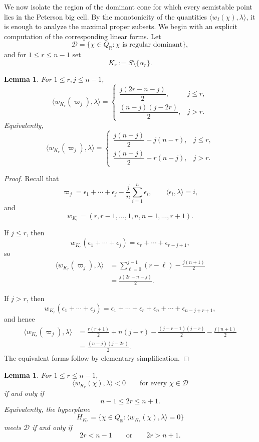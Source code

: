 \documentclass[12pt, reqno]{amsart}
\theoremstyle{plain}
\numberwithin{equation}{section}
\newtheorem{lemma}[theorem]{Lemma}
\theoremstyle{definition}
\begin{document}
We now isolate the region of the dominant cone for which every
semistable point lies in the Peterson big cell. By the monotonicity
of the quantities
\(\langle w_I(\chi),\lambda\rangle\), it is enough to analyze the
maximal proper subsets. 
We begin with an explicit computation of the corresponding linear
forms. Let
\[
\mathcal D
=
\{\chi\in Q_{\mathbb R}:\chi\text{ is regular dominant}\},
\]
and for \(1\le r\le n-1\) set
\[
K_r:=S\setminus\{\alpha_r\}.
\]

\begin{lemma}\label{lem:maximal-parabolic-weights}
For \(1\le r,j\le n-1\),
\[
\bigl\langle w_{K_r}(\varpi_j),\lambda\bigr\rangle
=
\begin{cases}
\dfrac{j(2r-n-j)}2, & j\le r,\\[6pt]
\dfrac{(n-j)(j-2r)}2, & j>r.
\end{cases}
\]
Equivalently,
\[
\bigl\langle w_{K_r}(\varpi_j),\lambda\bigr\rangle
=
\begin{cases}
\dfrac{j(n-j)}2-j(n-r), & j\le r,\\[6pt]
\dfrac{j(n-j)}2-r(n-j), & j>r.
\end{cases}
\]
\end{lemma}

\begin{proof}
Recall that
\[
\varpi_j
=
\epsilon_1+\cdots+\epsilon_j
-\frac{j}{n}\sum_{i=1}^n\epsilon_i,
\qquad
\langle\epsilon_i,\lambda\rangle=i,
\]
and
\[
w_{K_r}
=
(r,r-1,\ldots,1,n,n-1,\ldots,r+1).
\]

If \(j\le r\), then
\[
w_{K_r}(\epsilon_1+\cdots+\epsilon_j)
=
\epsilon_r+\cdots+\epsilon_{r-j+1},
\]
so
\[
\begin{aligned}
\bigl\langle w_{K_r}(\varpi_j),\lambda\bigr\rangle
&=
\sum_{\ell=0}^{j-1}(r-\ell)
-\frac{j(n+1)}2  \\
&=
\frac{j(2r-n-j)}2.
\end{aligned}
\]

If \(j>r\), then
\[
w_{K_r}(\epsilon_1+\cdots+\epsilon_j)
=
\epsilon_1+\cdots+\epsilon_r
+\epsilon_n+\cdots+\epsilon_{n-j+r+1},
\]
and hence
\[
\begin{aligned}
\bigl\langle w_{K_r}(\varpi_j),\lambda\bigr\rangle
&=
\frac{r(r+1)}2
+n(j-r)
-\frac{(j-r-1)(j-r)}2
-\frac{j(n+1)}2 \\
&=
\frac{(n-j)(j-2r)}2.
\end{aligned}
\]
The equivalent forms follow by elementary simplification.
\end{proof}

\begin{lemma}\label{lem:maximal-parabolic-walls}
For \(1\le r\le n-1\),
\[
\langle w_{K_r}(\chi),\lambda\rangle<0
\qquad
\text{for every }\chi\in\mathcal D
\]
if and only if
\[
n-1\le2r\le n+1.
\]
Equivalently, the hyperplane
\[
H_{K_r}
=
\{\chi\in Q_{\mathbb R}:
\langle w_{K_r}(\chi),\lambda\rangle=0\}
\]
meets \(\mathcal D\) if and only if
\[
2r<n-1
\qquad\text{or}\qquad
2r>n+1.
\]
\end{lemma}
\end{document}
